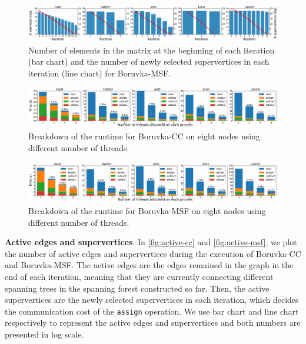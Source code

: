 \documentclass{sokendai_thesis} %
\newcommand{\boruvka}[0]{Boruvka}
\begin{document}
\begin{figure}[t]
\centering
\includegraphics[width=\textwidth]{figures/iter-active-MSF.pdf}
\vspace{-8pt}
\caption{Number of elements in the matrix at the beginning of each iteration (bar chart) and the number of newly selected supervertices in each iteration (line chart) for \boruvka{}-MSF.}
\vspace{-8pt}
\label{fig:active-msf}
\end{figure}

\begin{figure}[t]
\centering
\includegraphics[width=\textwidth]{figures/CC-runtime-breakdown.pdf}
\vspace{-8pt}
\caption{Breakdown of the runtime for \boruvka{}-CC on eight nodes using different number of threads.}
\vspace{-8pt}
\label{fig:breakdown-cc}
\end{figure}

\begin{figure}[t]
\centering
\includegraphics[width=\textwidth]{figures/MSF-runtime-breakdown.pdf}
\caption{Breakdown of the runtime for \boruvka{}-MSF on eight nodes using different number of threads.}
\vspace{-8pt}
\label{fig:breakdown-msf}
\end{figure}

\textbf{Active edges and supervertices}.
In \autoref{fig:active-cc} and \autoref{fig:active-msf}, we plot the number of active edges and supervertices during the execution of \boruvka{}-CC and \boruvka{}-MSF.
The active edges are the edges remained in the graph in the end of each iteration, meaning that they are currently connecting different spanning trees in the spanning forest constructed so far.
Then, the active supervertices are the newly selected supervertices in each iteration, which decides the communication cost of the \texttt{assign} operation.
We use bar chart and line chart respectively to represent the active edges and supervertices and both numbers are presented in log scale.
\end{document}
